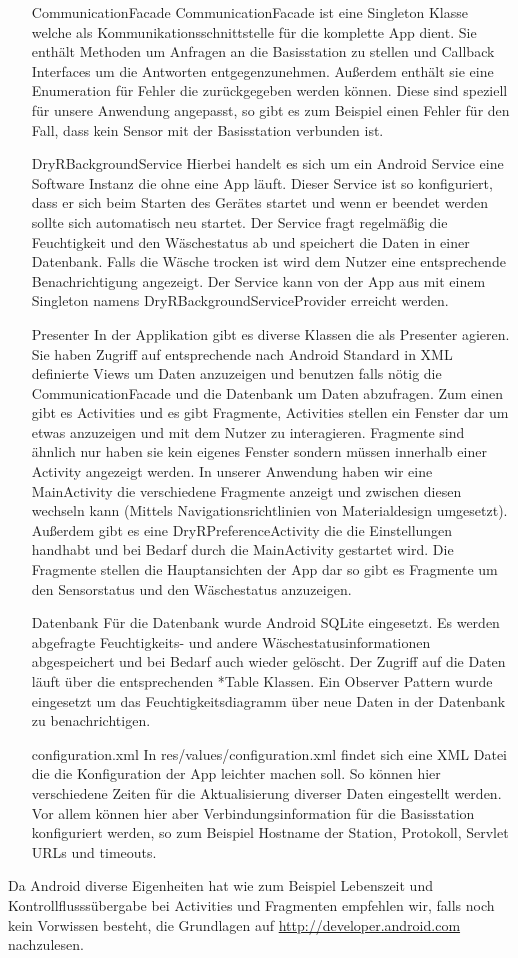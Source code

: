 \begin{enumerate}
	\item[CommunicationFacade] CommunicationFacade ist eine Singleton Klasse welche als Kommunikationsschnittstelle für die komplette App dient. Sie enthält Methoden um Anfragen an die Basisstation zu stellen und Callback Interfaces um die Antworten entgegenzunehmen. Außerdem enthält sie eine Enumeration für Fehler die zurückgegeben werden können. Diese sind speziell für unsere Anwendung angepasst, so gibt es zum Beispiel einen Fehler für den Fall, dass kein Sensor mit der Basisstation verbunden ist.
	
	\item[DryRBackgroundService] Hierbei handelt es sich um ein Android Service eine Software Instanz die ohne eine App läuft. Dieser Service ist so konfiguriert, dass er sich beim Starten des Gerätes startet und wenn er beendet werden sollte sich automatisch neu startet. Der Service fragt regelmäßig die Feuchtigkeit und den Wäschestatus ab und speichert die Daten in einer Datenbank. Falls die Wäsche trocken ist wird dem Nutzer eine entsprechende Benachrichtigung angezeigt. Der Service kann von der App aus mit einem Singleton namens DryRBackgroundServiceProvider erreicht werden.
	
	\item[Presenter] In der Applikation gibt es diverse Klassen die als Presenter agieren. Sie haben Zugriff auf entsprechende nach Android Standard in XML definierte Views um Daten anzuzeigen und benutzen falls nötig die CommunicationFacade und die Datenbank um Daten abzufragen. Zum einen gibt es Activities und es gibt Fragmente, Activities stellen ein Fenster dar um etwas anzuzeigen und mit dem Nutzer zu interagieren. Fragmente sind ähnlich nur haben sie kein eigenes Fenster sondern müssen innerhalb einer Activity angezeigt werden. In unserer Anwendung haben wir eine MainActivity die verschiedene Fragmente anzeigt und zwischen diesen wechseln kann (Mittels Navigationsrichtlinien von Materialdesign umgesetzt). Außerdem gibt es eine DryRPreferenceActivity die die Einstellungen handhabt und bei Bedarf durch die MainActivity gestartet wird. Die Fragmente stellen die Hauptansichten der App dar so gibt es Fragmente um den Sensorstatus und den Wäschestatus anzuzeigen.
	
	\item[Datenbank] Für die Datenbank wurde Android SQLite eingesetzt. Es werden abgefragte Feuchtigkeits- und andere Wäschestatusinformationen abgespeichert und bei Bedarf auch wieder gelöscht. Der Zugriff auf die Daten läuft über die entsprechenden *Table Klassen. Ein Observer Pattern wurde eingesetzt um das Feuchtigkeitsdiagramm über neue Daten in der Datenbank zu benachrichtigen.
	
	\item[configuration.xml] In res/values/configuration.xml findet sich eine XML Datei die die Konfiguration der App leichter machen soll. So können hier verschiedene Zeiten für die Aktualisierung diverser Daten eingestellt werden. Vor allem können hier aber Verbindungsinformation für die Basisstation konfiguriert werden, so zum Beispiel Hostname der Station, Protokoll, Servlet URLs und timeouts.
\end{enumerate}
Da Android diverse Eigenheiten hat wie zum Beispiel Lebenszeit und Kontrollflusssübergabe bei Activities und Fragmenten empfehlen wir, falls noch kein Vorwissen besteht, die Grundlagen auf \url{http://developer.android.com} nachzulesen.
